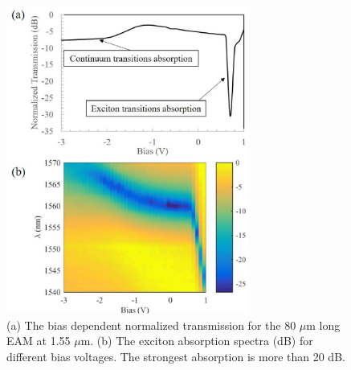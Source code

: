 \documentclass[aip,apl,reprint,a4paper]{revtex4-1}
\begin{document}
\begin{figure}
	\includegraphics[width=8cm]{figure/fig5.eps}%
	\caption{\label{fig:5} (a) The bias dependent normalized transmission for the 80 $\mu$m long EAM at 1.55 $\mu$m. (b) The exciton absorption spectra (dB) for different bias voltages. The strongest absorption is more than 20 dB.}
\end{figure}
\end{document}

